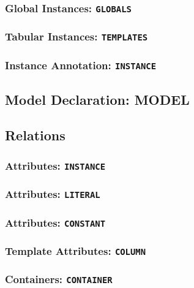 \documentclass[11pt,a4paper]{ivoa}
\begin{document}
\subsubsection{Global Instances:
\texttt{GLOBALS}}\label{global-instances-globals}

\subsubsection{Tabular Instances:
\texttt{TEMPLATES}}\label{tabular-instances-templates}

\subsubsection{Instance Annotation:
\texttt{INSTANCE}}\label{instance-annotation-instance}

\subsection{Model Declaration: MODEL}\label{sec:norm-model}

\subsection{Relations}\label{sec:norm-relations}

\subsubsection{Attributes: \texttt{INSTANCE}}\label{attributes-instance}

\subsubsection{Attributes: \texttt{LITERAL}}\label{attributes-literal}

\subsubsection{Attributes: \texttt{CONSTANT}}\label{attributes-constant}

\subsubsection{Template Attributes:
\texttt{COLUMN}}\label{template-attributes-column}

\subsubsection{Containers:
\texttt{CONTAINER}}\label{containers-container}
\end{document}
